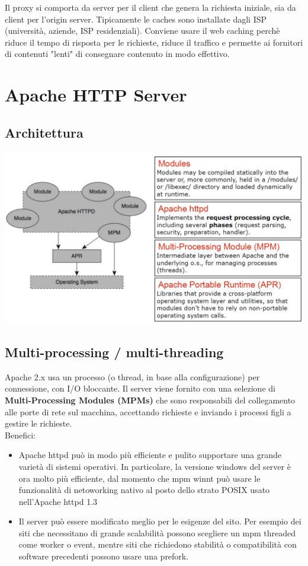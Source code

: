 Il proxy si comporta da server per il client che genera la richiesta iniziale, sia da client per l'origin server. Tipicamente le caches sono installate dagli ISP (università, aziende, ISP residenziali). Conviene usare il web caching perchè riduce il tempo di risposta per le richieste, riduce il traffico e permette ai fornitori di contenuti "lenti" di consegnare contenuto in modo effettivo. 


\chapter{Apache HTTP Server}

\section{Architettura}
\begin{center}
\includegraphics[scale=0.4]{Images/TecnologieWeb/2/Architettura.jpg}    
\end{center}

\section{Multi-processing / multi-threading}
Apache 2.x usa un processo (o thread, in base alla configurazione) per connessione, con I/O bloccante. Il server viene fornito con una selezione di \textbf{Multi-Processing Modules (MPMs)}  che sono responsabili del collegamento alle porte di rete sul macchina, accettando richieste e inviando i processi figli a gestire le richieste.\\
Benefici:
\begin{itemize}
    \item Apache httpd può in modo più efficiente e pulito supportare una grande varietà di sistemi operativi. In particolare, la versione windows del server è ora molto più efficiente, dal momento che mpm winnt può usare le funzionalità di netoworking nativo al posto dello strato POSIX usato nell'Apache httpd 1.3
    \item Il server può essere modificato meglio per le esigenze del sito. Per esempio dei siti che necessitano di grande scalabilità possono scegliere un mpm threaded come worker o event, mentre siti che richiedono stabilità o compatibilità con software precedenti possono usare una prefork.
\end{itemize}

